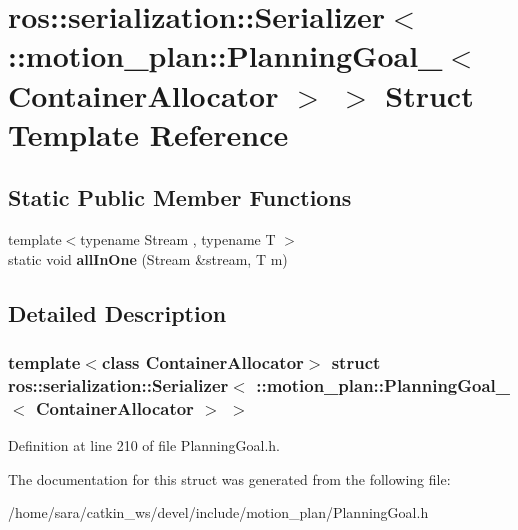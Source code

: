 \hypertarget{structros_1_1serialization_1_1Serializer_3_01_1_1motion__plan_1_1PlanningGoal___3_01ContainerAllocator_01_4_01_4}{}\section{ros\+:\+:serialization\+:\+:Serializer$<$ \+:\+:motion\+\_\+plan\+:\+:Planning\+Goal\+\_\+$<$ Container\+Allocator $>$ $>$ Struct Template Reference}
\label{structros_1_1serialization_1_1Serializer_3_01_1_1motion__plan_1_1PlanningGoal___3_01ContainerAllocator_01_4_01_4}
\subsection*{Static Public Member Functions}
\begin{DoxyCompactItemize}
\item 
\mbox{\label{structros_1_1serialization_1_1Serializer_3_01_1_1motion__plan_1_1PlanningGoal___3_01ContainerAllocator_01_4_01_4_af322c12df6745b587f085bb038a71feb}} 
{\footnotesize template$<$typename Stream , typename T $>$ }\\static void {\bfseries all\+In\+One} (Stream \&stream, T m)
\end{DoxyCompactItemize}


\subsection{Detailed Description}
\subsubsection*{template$<$class Container\+Allocator$>$\newline
struct ros\+::serialization\+::\+Serializer$<$ \+::motion\+\_\+plan\+::\+Planning\+Goal\+\_\+$<$ Container\+Allocator $>$ $>$}



Definition at line 210 of file Planning\+Goal.\+h.



The documentation for this struct was generated from the following file\+:\begin{DoxyCompactItemize}
\item 
/home/sara/catkin\+\_\+ws/devel/include/motion\+\_\+plan/Planning\+Goal.\+h\end{DoxyCompactItemize}
